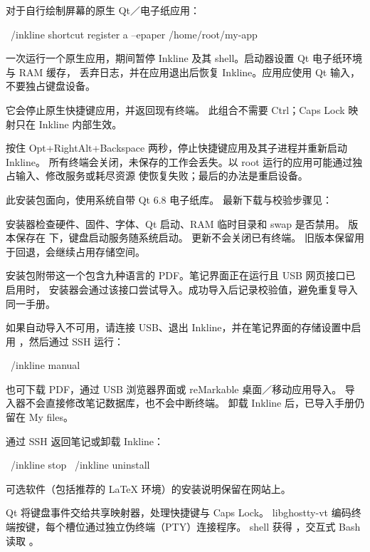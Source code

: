 对于自行绘制屏幕的原生 Qt／电子纸应用：
\begin{shell}
~/inkline shortcut register a --epaper /home/root/my-app
\end{shell}
一次运行一个原生应用，期间暂停 Inkline 及其 shell。启动器设置 Qt 电子纸环境与 RAM 缓存，
丢弃日志，并在应用退出后恢复 Inkline。应用应使用 Qt 输入，不要独占键盘设备。

\begin{notice}
它会停止原生快捷键应用，并返回现有终端。
此组合不需要 Ctrl；Caps Lock 映射只在 Inkline 内部生效。
\end{notice}

按住 Opt+RightAlt+Backspace 两秒，停止快捷键应用及其子进程并重新启动 Inkline。
所有终端会关闭，未保存的工作会丢失。以 root 运行的应用可能通过独占输入、修改服务或耗尽资源
使恢复失败；最后的办法是重启设备。

此安装包面向，使用系统自带 Qt 6.8 电子纸库。
最新下载与校验步骤见：

\InstallLink

安装器检查硬件、固件、字体、Qt 启动、RAM 临时目录和 swap 是否禁用。
版本保存在  下，键盘启动服务随系统启动。
更新不会关闭已有终端。
旧版本保留用于回退，会继续占用存储空间。

安装包附带这一个包含九种语言的 PDF。笔记界面正在运行且 USB 网页接口已启用时，
安装器会通过该接口尝试导入。成功导入后记录校验值，避免重复导入同一手册。

如果自动导入不可用，请连接 USB、退出 Inkline，并在笔记界面的存储设置中启用
，然后通过 SSH 运行：
\begin{shell}
~/inkline manual
\end{shell}
也可下载 PDF，通过 USB 浏览器界面或 reMarkable 桌面／移动应用导入。
导入器不会直接修改笔记数据库，也不会中断终端。
卸载 Inkline 后，已导入手册仍留在 My files。

通过 SSH 返回笔记或卸载 Inkline：
\begin{shell}
~/inkline stop
~/inkline uninstall
\end{shell}
可选软件（包括推荐的 LaTeX 环境）的安装说明保留在网站上。

Qt 将键盘事件交给共享映射器，处理快捷键与 Caps Lock。
libghostty-vt 编码终端按键，每个槽位通过独立伪终端（PTY）连接程序。
shell 获得 ，交互式 Bash 读取 。

